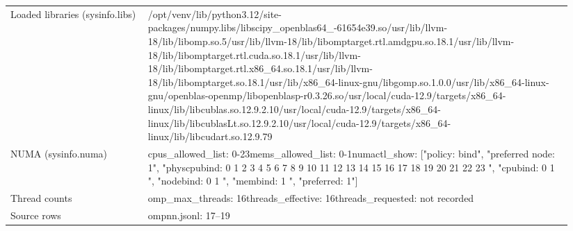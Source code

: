 \begin{longtable}{>{\raggedright\arraybackslash}p{0.23\linewidth}>{\raggedright\arraybackslash}p{0.71\linewidth}}
Loaded libraries (sysinfo.libs) & /\allowbreak{}opt/\allowbreak{}venv/\allowbreak{}lib/\allowbreak{}python3.12/\allowbreak{}site-packages/\allowbreak{}numpy.libs/\allowbreak{}libscipy\_\allowbreak{}openblas64\_\allowbreak{}-61654e39.so\newline /\allowbreak{}usr/\allowbreak{}lib/\allowbreak{}llvm-18/\allowbreak{}lib/\allowbreak{}libomp.so.5\newline /\allowbreak{}usr/\allowbreak{}lib/\allowbreak{}llvm-18/\allowbreak{}lib/\allowbreak{}libomptarget.rtl.amdgpu.so.18.1\newline /\allowbreak{}usr/\allowbreak{}lib/\allowbreak{}llvm-18/\allowbreak{}lib/\allowbreak{}libomptarget.rtl.cuda.so.18.1\newline /\allowbreak{}usr/\allowbreak{}lib/\allowbreak{}llvm-18/\allowbreak{}lib/\allowbreak{}libomptarget.rtl.x86\_\allowbreak{}64.so.18.1\newline /\allowbreak{}usr/\allowbreak{}lib/\allowbreak{}llvm-18/\allowbreak{}lib/\allowbreak{}libomptarget.so.18.1\newline /\allowbreak{}usr/\allowbreak{}lib/\allowbreak{}x86\_\allowbreak{}64-linux-gnu/\allowbreak{}libgomp.so.1.0.0\newline /\allowbreak{}usr/\allowbreak{}lib/\allowbreak{}x86\_\allowbreak{}64-linux-gnu/\allowbreak{}openblas-openmp/\allowbreak{}libopenblasp-r0.3.26.so\newline /\allowbreak{}usr/\allowbreak{}local/\allowbreak{}cuda-12.9/\allowbreak{}targets/\allowbreak{}x86\_\allowbreak{}64-linux/\allowbreak{}lib/\allowbreak{}libcublas.so.12.9.2.10\newline /\allowbreak{}usr/\allowbreak{}local/\allowbreak{}cuda-12.9/\allowbreak{}targets/\allowbreak{}x86\_\allowbreak{}64-linux/\allowbreak{}lib/\allowbreak{}libcublasLt.so.12.9.2.10\newline /\allowbreak{}usr/\allowbreak{}local/\allowbreak{}cuda-12.9/\allowbreak{}targets/\allowbreak{}x86\_\allowbreak{}64-linux/\allowbreak{}lib/\allowbreak{}libcudart.so.12.9.79 \\
NUMA (sysinfo.numa) & cpus\_\allowbreak{}allowed\_\allowbreak{}list: 0-23\newline mems\_\allowbreak{}allowed\_\allowbreak{}list: 0-1\newline numactl\_\allowbreak{}show: ["policy: bind", "preferred node: 1", "physcpubind: 0 1 2 3 4 5 6 7 8 9 10 11 12 13 14 15 16 17 18 19 20 21 22 23 ", "cpubind: 0 1 ", "nodebind: 0 1 ", "membind: 1 ", "preferred: 1"] \\
Thread counts & omp\_\allowbreak{}max\_\allowbreak{}threads: 16\newline threads\_\allowbreak{}effective: 16\newline threads\_\allowbreak{}requested: not recorded \\
Source rows & ompnn.jsonl: 17–19 \\
\end{longtable}
